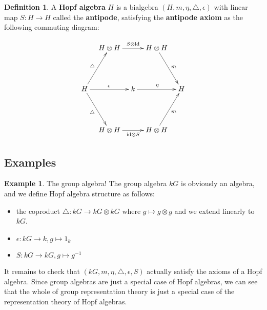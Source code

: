 \documentclass[11pt]{article}
\newcommand{\rt}{\xrightarrow{}}
\newcommand{\id}{\text{id}}
\newcommand{\define}[1]{\textbf{#1}}
\theoremstyle{definition}
\newtheorem{definition}[lemma]{Definition}
\newtheorem{example}[lemma]{Example}
\begin{document}
\begin{definition} A \define{Hopf algebra} $H$ is a bialgebra $(H,m,\eta, \triangle, \epsilon)$ with linear map $S:H \rt H$ called the \define{antipode}, satisfying the \define{antipode axiom} as the following commuting diagram:
\begin{useimager}
$$\xymatrix@C-1.5em@R+2em{
 & H \otimes H \ar[rr]^{S \otimes \id} & & H \otimes H \ar[dr]^m & \\
H \ar[ur]^\triangle \ar[dr]_\triangle \ar[rr]^\epsilon & & k \ar[rr]^\eta & & H \\
 & H \otimes H \ar[rr]_{\id \otimes S} & & H \otimes H \ar[ur]_m &
}
$$\end{useimager}
\end{definition}

\subsection{Examples}
\begin{example} The group algebra! The group algebra $kG$ is obviously an algebra, and we define Hopf algebra structure as follows:\begin{itemize}
  \item the coproduct $\triangle:kG\rt kG\otimes kG$ where $g\mapsto g\otimes g$ and we extend linearly to $kG$.
  \item $\epsilon:kG \rt k, g\mapsto 1_k$
  \item $S:kG\rt kG, g\mapsto g^{-1}$
\end{itemize}
It remains to check that $(kG,m,\eta,\triangle,\epsilon,S)$ actually satisfy the axioms of a Hopf algebra. Since group algebras are just a special case of Hopf algebras, we can see that the whole of group representation theory is just a special case of the representation theory of Hopf algebras.
\end{example}
\end{document}
